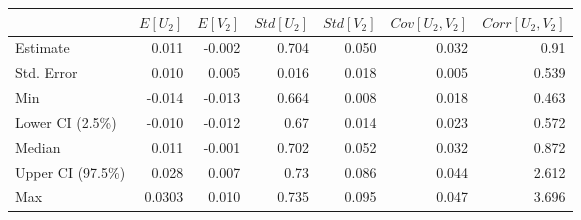 \begin{tabular}{lrrrrrr}
\toprule
{} &    $E[U_2]$ &    $E[V_2]$ &  $Std[U_2]$ &  $Std[V_2]$ &  $Cov[U_2, V_2]$ &  $Corr[U_2, V_2]$ \\
\midrule
Estimate         &    0.011 &   -0.002 &    0.704 &    0.050 &         0.032 &          0.91 \\
Std. Error       &    0.010 &    0.005 &    0.016 &    0.018 &         0.005 &          0.539 \\
Min              &   -0.014 &   -0.013 &    0.664 &    0.008 &         0.018 &          0.463 \\
Lower CI (2.5\%)  &   -0.010 &   -0.012 &    0.67 &    0.014 &         0.023 &          0.572 \\
Median           &    0.011 &   -0.001 &    0.702 &    0.052 &         0.032 &          0.872 \\
Upper CI (97.5\%) &    0.028 &    0.007 &    0.73 &    0.086 &         0.044 &          2.612 \\
Max              &    0.0303 &    0.010 &    0.735 &    0.095 &         0.047 &          3.696 \\
\bottomrule
\end{tabular}
